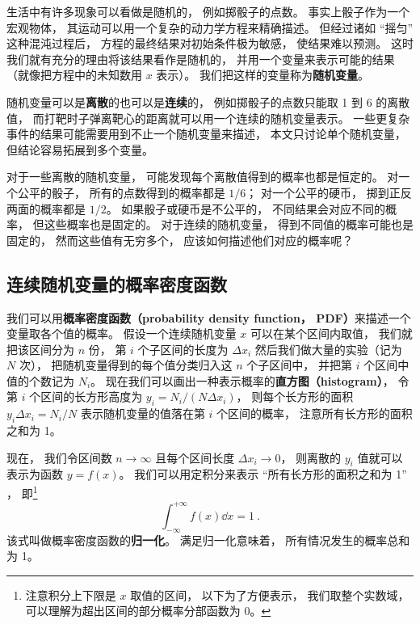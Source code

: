 


生活中有许多现象可以看做是随机的， 例如掷骰子的点数。 事实上骰子作为一个宏观物体， 其运动可以用一个复杂的动力学方程来精确描述。 但经过诸如 “摇匀” 这种混沌过程后， 方程的最终结果对初始条件极为敏感， 使结果难以预测。 这时我们就有充分的理由将该结果看作是随机的， 并用一个变量来表示可能的结果（就像把方程中的未知数用 $x$ 表示）。 我们把这样的变量称为\textbf{随机变量}。

随机变量可以是\textbf{离散}的也可以是\textbf{连续}的， 例如掷骰子的点数只能取 1 到 6 的离散值， 而打靶时子弹离靶心的距离就可以用一个连续的随机变量表示。 一些更复杂事件的结果可能需要用到不止一个随机变量来描述， 本文只讨论单个随机变量， 但结论容易拓展到多个变量。

对于一些离散的随机变量， 可能发现每个离散值得到的概率也都是恒定的。 对一个公平的骰子， 所有的点数得到的概率都是 $1/6$； 对一个公平的硬币， 掷到正反两面的概率都是 $1/2$。 如果骰子或硬币是不公平的， 不同结果会对应不同的概率， 但这些概率也是固定的。 对于连续的随机变量， 得到不同值的概率可能也是固定的， 然而这些值有无穷多个， 应该如何描述他们对应的概率呢？

\subsection{连续随机变量的概率密度函数}
我们可以用\textbf{概率密度函数（probability density function， PDF）}来描述一个变量取各个值的概率。 假设一个连续随机变量 $x$ 可以在某个区间内取值， 我们就把该区间分为 $n$ 份， 第 $i$ 个子区间的长度为 $\Delta x_i$ 然后我们做大量的实验（记为 $N$ 次）， 把随机变量得到的每个值分类归入这 $n$ 个子区间中， 并把第 $i$ 个区间中值的个数记为 $N_i$。 现在我们可以画出一种表示概率的\textbf{直方图（histogram）}， 令第 $i$ 个区间的长方形高度为 $y_i = N_i/(N \Delta x_i)$， 则每个长方形的面积 $y_i \Delta x_i = N_i/N$ 表示随机变量的值落在第 $i$ 个区间的概率， 注意所有长方形的面积之和为 1。


现在， 我们令区间数 $n\to \infty$ 且每个区间长度 $\Delta x_i \to 0$， 则离散的 $y_i$ 值就可以表示为函数 $y = f(x)$。 我们可以用定积分来表示 “所有长方形的面积之和为 1” ， 即\footnote{注意积分上下限是 $x$ 取值的区间， 以下为了方便表示， 我们取整个实数域， 可以理解为超出区间的部分概率分部函数为 0。}
\begin{equation}\label{eq_RandF_1}
\int_{-\infty}^{+\infty} f(x)\dd x = 1~.
\end{equation}
该式叫做概率密度函数的\textbf{归一化}。 满足归一化意味着， 所有情况发生的概率总和为 1。

